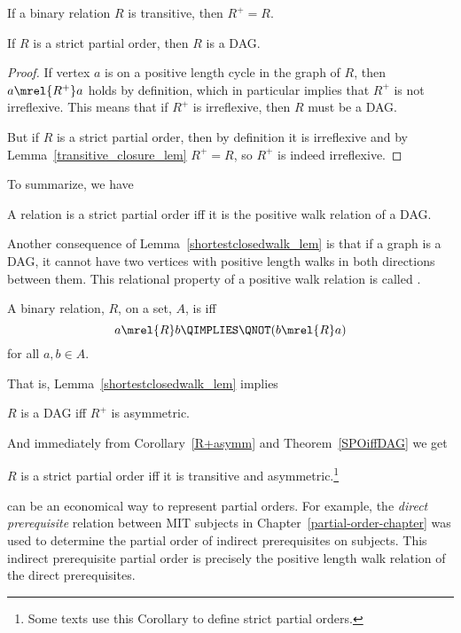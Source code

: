 \begin{definition}
\begin{lemma}\label{transitive_closure_lem}
If a binary relation $R$ is transitive, then $R^+ = R$.
\end{lemma}

\begin{corollary}
If $R$ is a strict partial order, then $R$ is a DAG.
\end{corollary}

\begin{proof}
If vertex $a$ is on a positive length cycle in the graph of $R$, then
$a \mrel{R^+} a$ holds by definition, which in particular implies that
$R^+$ is not irreflexive.  This means that if $R^+$ is irreflexive,
then $R$ must be a DAG.

But if $R$ is a strict partial order, then by definition it is
irreflexive and by Lemma~\ref{transitive_closure_lem} $R^+ = R$, so
$R^+$ is indeed irreflexive.
\end{proof}

To summarize, we have
\begin{theorem}\label{SPOiffDAG}
A relation is a strict partial order iff it is the positive walk relation of a DAG.
\end{theorem}

Another consequence of Lemma~\ref{shortestclosedwalk_lem} is that if a
graph is a DAG, it cannot have two vertices with positive length walks
in both directions between them.  This relational property of a
positive walk relation is called .

\begin{definition}
A binary relation, $R$, on a set, $A$, is  iff
\[
a \mrel{R} b \QIMPLIES \QNOT(b \mrel{R} a)
\]
for all $a,b \in A$.
\end{definition}

That is, Lemma~\ref{shortestclosedwalk_lem} implies
\begin{corollary}\label{R+asymm}
$R$ is a DAG iff $R^+$ is asymmetric.
\end{corollary}

And immediately from Corollary~\ref{R+asymm} and Theorem~\ref{SPOiffDAG}
we get
\begin{corollary}
$R$ is a strict partial order iff it is transitive and
  asymmetric.\footnote{Some texts use this Corollary to define strict
    partial orders.}
\end{corollary}


\iffalse
can be an economical way to represent partial orders.  For example,
the \emph{direct prerequisite} relation between MIT subjects in
Chapter~\ref{partial-order-chapter} was used to determine the partial
order of indirect prerequisites on subjects.  This indirect
prerequisite partial order is precisely the positive length walk
relation of the direct prerequisites.


\end{definition}
